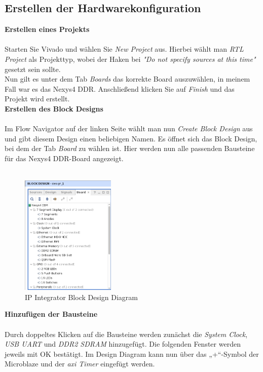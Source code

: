 \subsection{Erstellen der Hardwarekonfiguration}\label{kap:microblazehardware}


\textbf{Erstellen eines Projekts}\\\\
Starten Sie Vivado und wählen Sie \emph{New Project} aus.
Hierbei wählt man \emph{RTL Project} als Projekttyp, wobei der Haken bei \emph{"Do not specify sources at this time"} gesetzt sein sollte.\\
Nun gilt es unter dem Tab \emph{Boards} das korrekte Board auszuwählen, in meinem Fall war es das Nexys4 DDR.
Anschließend klicken Sie auf \emph{Finish} und das Projekt wird erstellt.\\


\newpage
\textbf{Erstellen des Block Designs}\\\\
Im Flow Navigator  auf der linken Seite wählt man nun \emph{Create Block Design} aus und
 gibt diesem Design einen beliebigen Namen.
Es öffnet sich das Block Design, bei dem der Tab \emph{Board} zu wählen ist. Hier werden nun
alle passenden Bausteine für das Nexys4 DDR-Board angezeigt.\\\\

\begin{figure}[H]
\centering
\includegraphics[width=0.4\textwidth]{Hauptteil/schritt3.png}
\caption{IP Integrator Block Design Diagram}\label{fig:mbschritt3}
\end{figure}

\vspace{10mm}


\textbf{Hinzufügen der Bausteine}\\\\
Durch doppeltes Klicken auf die Bausteine werden zunächst die \emph{System Clock}, \emph{USB UART} und \emph{DDR2 SDRAM} hinzugefügt. Die folgenden Fenster werden jeweils mit OK bestätigt.
Im Design Diagram kann nun über das „+“-Symbol der Microblaze und der \emph{\ac{axi} Timer} eingefügt werden.\\

